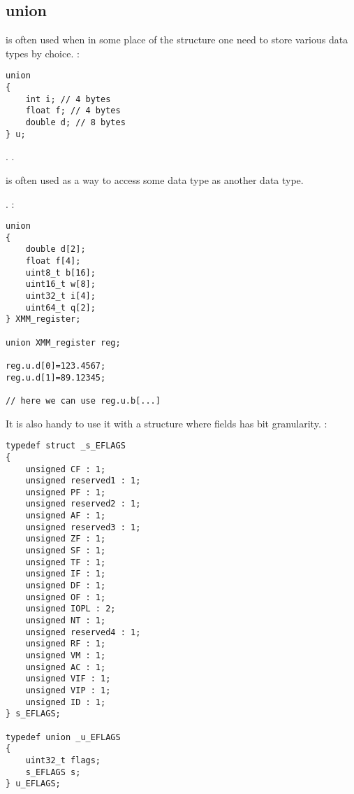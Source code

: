﻿\subsection{union}

 
{is often used when in some place of the structure one need to store various data types by choice}.
:

\begin{lstlisting}
union
{
	int i; // 4 bytes
	float f; // 4 bytes
	double d; // 8 bytes
} u;
\end{lstlisting}

  .
.

 
{is often used as a way to access some data type as another data type}.

.
:

\begin{lstlisting}
union
{
	double d[2];
	float f[4];
	uint8_t b[16];
	uint16_t w[8];
	uint32_t i[4];
	uint64_t q[2];
} XMM_register;

union XMM_register reg;

reg.u.d[0]=123.4567;
reg.u.d[1]=89.12345;

// here we can use reg.u.b[...]

\end{lstlisting}

{It is also handy to use it with a structure where fields has bit granularity}.
:

\begin{lstlisting}
typedef struct _s_EFLAGS
{
    unsigned CF : 1;
    unsigned reserved1 : 1;
    unsigned PF : 1;
    unsigned reserved2 : 1;
    unsigned AF : 1;
    unsigned reserved3 : 1;
    unsigned ZF : 1;
    unsigned SF : 1;
    unsigned TF : 1;
    unsigned IF : 1;
    unsigned DF : 1;
    unsigned OF : 1;
    unsigned IOPL : 2;
    unsigned NT : 1;
    unsigned reserved4 : 1;
    unsigned RF : 1;
    unsigned VM : 1;
    unsigned AC : 1;
    unsigned VIF : 1;
    unsigned VIP : 1;
    unsigned ID : 1;
} s_EFLAGS;

typedef union _u_EFLAGS
{
    uint32_t flags;
    s_EFLAGS s;
} u_EFLAGS;
\end{lstlisting}

